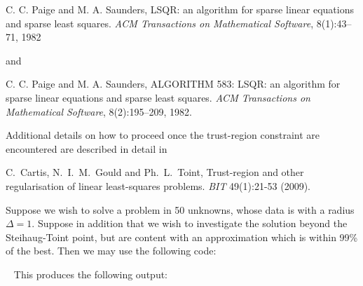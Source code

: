 \documentclass{galahad}
\begin{document}
\noindent
C. C. Paige and M. A. Saunders,
LSQR: an algorithm for sparse linear equations and sparse least  squares.
{\em ACM Transactions on Mathematical Software}, 8(1):43--71, 1982

\noindent
and

\noindent
C. C. Paige and M. A. Saunders,
ALGORITHM 583: LSQR: an algorithm for sparse linear equations and
  sparse least squares.
{\em ACM Transactions on Mathematical Software}, 8(2):195--209, 1982.

\noindent
Additional details on how to proceed once the trust-region constraint are
encountered are described in detail in
\vspace*{1mm}

\noindent
C.\ Cartis, N.\ I.\ M.\ Gould and Ph.\ L.\ Toint,
Trust-region and other regularisation of linear
least-squares problems.
{\em BIT} 49(1):21-53 (2009).


\galexample
Suppose we wish to solve a problem in 50 unknowns, whose data is
with a radius $\Delta = 1$. Suppose in addition that we wish to investigate
the solution beyond the Steihaug-Toint point, but are content with
an approximation which is within 99\% of the best.
Then we may use the following code:

{\tt \small
\VerbatimInput{\packageexample}
}
\noindent
This produces the following output:
{\tt \small
\VerbatimInput{\packageresults}
}
\end{document}
